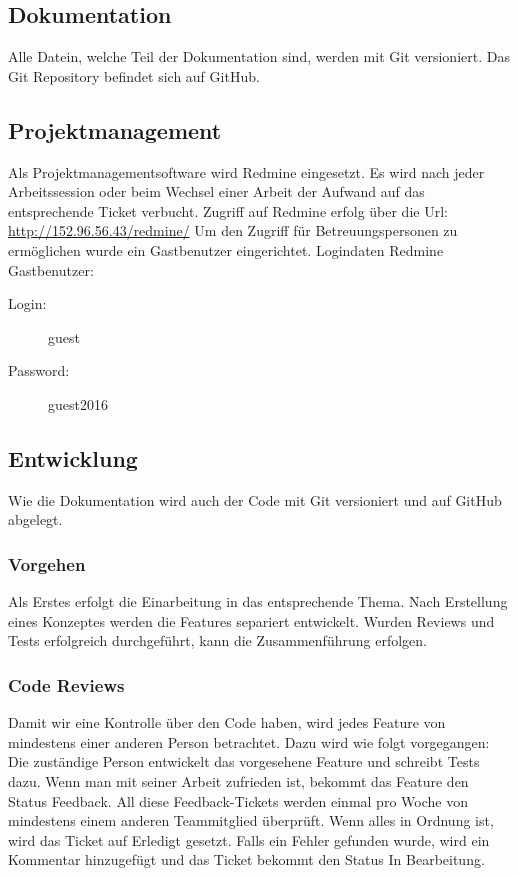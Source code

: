 \documentclass[a4,12pt]{scrartcl}
\begin{document}
\subsection{Dokumentation}
Alle Datein, welche Teil der Dokumentation sind, werden mit Git versioniert. Das Git Repository befindet sich auf GitHub.
\subsection{Projektmanagement}
Als Projektmanagementsoftware wird Redmine eingesetzt. 
Es wird nach jeder Arbeitssession oder beim Wechsel einer Arbeit der Aufwand auf das entsprechende Ticket verbucht.
Zugriff auf Redmine erfolg über die Url: \url{http://152.96.56.43/redmine/}
Um den Zugriff für Betreuungspersonen zu ermöglichen wurde ein Gastbenutzer eingerichtet.
\newline
\newline
Logindaten Redmine Gastbenutzer:
\begin{description}
\begin{description}
\item [Login:]
guest
\item [Password:]
guest2016
\end{description}
\end{description}


\subsection{Entwicklung}
Wie die Dokumentation wird auch der Code mit Git versioniert und auf GitHub abgelegt.

\subsubsection{Vorgehen}
Als Erstes erfolgt die Einarbeitung in das entsprechende Thema.
Nach Erstellung eines Konzeptes werden die Features separiert entwickelt.
Wurden Reviews und Tests erfolgreich durchgeführt, kann die Zusammenführung erfolgen.


\subsubsection{Code Reviews}
Damit wir eine Kontrolle über den Code haben, wird jedes Feature von mindestens einer anderen Person betrachtet.
Dazu wird wie folgt vorgegangen: \\
Die zuständige Person entwickelt das vorgesehene Feature und schreibt Tests dazu.
Wenn man mit seiner Arbeit zufrieden ist, bekommt das Feature den Status Feedback.
All diese Feedback-Tickets werden einmal pro Woche von mindestens einem anderen Teammitglied überprüft.
Wenn alles in Ordnung ist, wird das Ticket auf Erledigt gesetzt.
Falls ein Fehler gefunden wurde, wird ein Kommentar hinzugefügt und das Ticket bekommt den Status In Bearbeitung.
\end{document}
